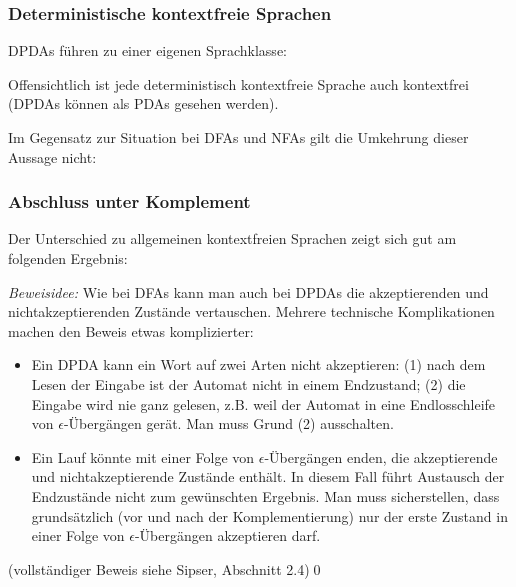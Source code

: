 \documentclass[onlymath]{beamer}
\begin{document}
\begin{frame}\frametitle{Deterministische kontextfreie Sprachen}

DPDAs führen zu einer eigenen Sprachklasse:


Offensichtlich ist jede deterministisch kontextfreie Sprache auch kontextfrei (DPDAs können als PDAs gesehen werden).
\medskip\pause

Im Gegensatz zur Situation bei DFAs und NFAs gilt die Umkehrung dieser Aussage nicht:


\end{frame}

\begin{frame}\frametitle{Abschluss unter Komplement}

Der Unterschied zu allgemeinen kontextfreien Sprachen zeigt sich gut am folgenden Ergebnis:

\medskip

\emph{Beweisidee: } Wie bei DFAs kann man auch bei DPDAs die akzeptierenden und nichtakzeptierenden Zustände 
vertauschen. Mehrere technische Komplikationen machen den Beweis etwas komplizierter:

{\tiny
\begin{itemize}
\item Ein DPDA kann ein Wort auf zwei Arten nicht akzeptieren: (1) nach dem Lesen der Eingabe ist der Automat
nicht in einem Endzustand; (2) die Eingabe wird nie ganz gelesen, z.B. weil der Automat in eine Endlosschleife von 
$\epsilon$-Übergängen gerät. Man muss Grund (2) ausschalten.
\item Ein Lauf
könnte mit einer Folge von $\epsilon$-Übergängen enden, die akzeptierende und nichtakzeptierende Zustände enthält. In diesem Fall führt Austausch der Endzustände nicht zum gewünschten Ergebnis. Man
muss sicherstellen, dass grundsätzlich (vor und nach der Komplementierung) nur der erste Zustand in einer Folge von
$\epsilon$-Übergängen akzeptieren darf.
\end{itemize}}
{\tiny (vollständiger Beweis siehe Sipser, Abschnitt 2.4)}\qed

\end{frame}
\end{document}

